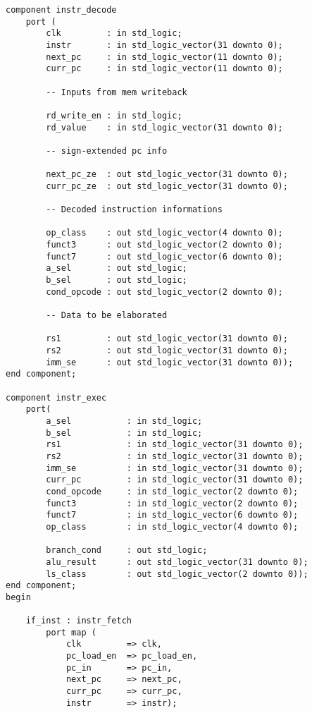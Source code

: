 \begin{code}
\begin{verbatim}
component instr_decode
    port (
        clk         : in std_logic;
        instr       : in std_logic_vector(31 downto 0);
        next_pc     : in std_logic_vector(11 downto 0);
        curr_pc     : in std_logic_vector(11 downto 0);
        
        -- Inputs from mem writeback
        
        rd_write_en : in std_logic;
        rd_value    : in std_logic_vector(31 downto 0);
        
        -- sign-extended pc info
        
        next_pc_ze  : out std_logic_vector(31 downto 0);
        curr_pc_ze  : out std_logic_vector(31 downto 0);
        
        -- Decoded instruction informations
        
        op_class    : out std_logic_vector(4 downto 0);
        funct3      : out std_logic_vector(2 downto 0);
        funct7      : out std_logic_vector(6 downto 0);
        a_sel       : out std_logic;
        b_sel       : out std_logic;
        cond_opcode : out std_logic_vector(2 downto 0);
        
        -- Data to be elaborated
        
        rs1         : out std_logic_vector(31 downto 0);
        rs2         : out std_logic_vector(31 downto 0);
        imm_se      : out std_logic_vector(31 downto 0));
end component;
    
component instr_exec
    port(
        a_sel           : in std_logic;
        b_sel           : in std_logic;    
        rs1             : in std_logic_vector(31 downto 0);
        rs2             : in std_logic_vector(31 downto 0);
        imm_se          : in std_logic_vector(31 downto 0);
        curr_pc         : in std_logic_vector(31 downto 0);
        cond_opcode     : in std_logic_vector(2 downto 0);
        funct3          : in std_logic_vector(2 downto 0);
        funct7          : in std_logic_vector(6 downto 0);
        op_class        : in std_logic_vector(4 downto 0);
        
        branch_cond     : out std_logic;
        alu_result      : out std_logic_vector(31 downto 0);
        ls_class        : out std_logic_vector(2 downto 0));
end component;
begin

    if_inst : instr_fetch
        port map (
            clk         => clk,
            pc_load_en  => pc_load_en,
            pc_in       => pc_in,
            next_pc     => next_pc,
            curr_pc     => curr_pc,
            instr       => instr);
        

\end{verbatim}
\end{code}
